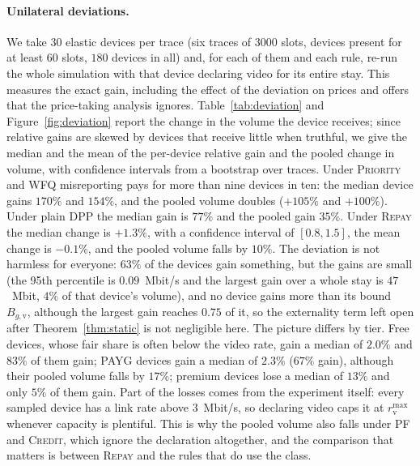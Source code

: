 \documentclass[preprint,11pt]{elsarticle}
\theoremstyle{definition}
\theoremstyle{remark}
\newcommand{\rmax}{r^{\max}}
\newcommand{\repay}{\textsc{Repay}}
\begin{document}
\paragraph{Unilateral deviations.}
We take $30$ elastic devices per trace (six traces of $3000$ slots, devices present for at least $60$ slots, $180$ devices in all) and, for each of them and each rule, re-run the whole simulation with that device declaring video for its entire stay.
This measures the exact gain, including the effect of the deviation on prices and offers that the price-taking analysis ignores.
Table~\ref{tab:deviation} and Figure~\ref{fig:deviation} report the change in the volume the device receives; since relative gains are skewed by devices that receive little when truthful, we give the median and the mean of the per-device relative gain and the pooled change in volume, with confidence intervals from a bootstrap over traces.
Under \textsc{Priority} and \textsc{WFQ} misreporting pays for more than nine devices in ten: the median device gains $170\%$ and $154\%$, and the pooled volume doubles ($+105\%$ and $+100\%$).
Under plain DPP the median gain is $77\%$ and the pooled gain $35\%$.
Under \repay{} the median change is $+1.3\%$, with a confidence interval of $[0.8,1.5]$, the mean change is $-0.1\%$, and the pooled volume falls by $10\%$.
The deviation is not harmless for everyone: $63\%$ of the devices gain something, but the gains are small (the 95th percentile is $0.09$~Mbit/s and the largest gain over a whole stay is $47$~Mbit, $4\%$ of that device's volume), and no device gains more than its bound $B_{g,\mathrm{v}}$, although the largest gain reaches $0.75$ of it, so the externality term left open after Theorem~\ref{thm:static} is not negligible here.
The picture differs by tier. Free devices, whose fair share is often below the video rate, gain a median of $2.0\%$ and $83\%$ of them gain; PAYG devices gain a median of $2.3\%$ ($67\%$ gain), although their pooled volume falls by $17\%$; premium devices lose a median of $13\%$ and only $5\%$ of them gain.
Part of the losses comes from the experiment itself: every sampled device has a link rate above $3$~Mbit/s, so declaring video caps it at $\rmax_{\mathrm{v}}$ whenever capacity is plentiful.
This is why the pooled volume also falls under \textsc{PF} and \textsc{Credit}, which ignore the declaration altogether, and the comparison that matters is between \repay{} and the rules that do use the class.
\end{document}
